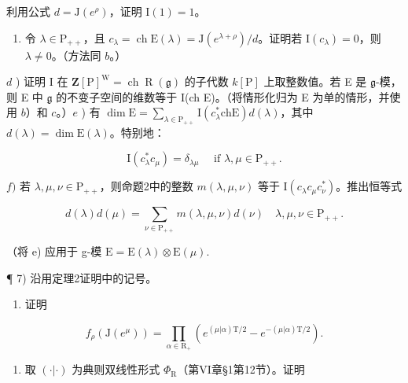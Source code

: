 利用公式 \(d = \mathrm{J}(e^{\rho})\)，证明 \(\mathrm{I}(1) = 1\)。

\begin{enumerate}
\def\labelenumi{\alph{enumi})}
\setcounter{enumi}{2}
\tightlist
\item
  令 \(\lambda \in \mathrm{P}_{++}\)，且 \(c_{\lambda} = \operatorname{ch} \mathrm{E}(\lambda) = \mathrm{J}(e^{\lambda + \rho}) / d\)。证明若 \(\mathrm{I}(c_{\lambda}) = 0\)，则 \(\lambda \neq 0\)。（方法同 \(b\)。）
\end{enumerate}

\(d\) ) 证明 I 在 \(\mathbf{Z}[\mathrm{P}]^{\mathrm{W}} = \operatorname {ch}\operatorname {R}(\mathfrak{g})\) 的子代数 \(k[\mathrm{P}]\) 上取整数值。若 E 是 \(\mathfrak{g}\)-模，则 E 中 \(\mathfrak{g}\) 的不变子空间的维数等于 I(ch E)。（将情形化归为 E 为单的情形，并使用 \(b\)）和 \(c\)。）\(e\) ) 有 \(\dim \mathrm{E} = \sum_{\lambda \in \mathrm{P}_{++}}\mathrm{I}(c_\lambda^*\mathrm{ch}\mathrm{E})d(\lambda)\)，其中 \(d(\lambda) = \dim \mathrm{E}(\lambda)\)。特别地：

\[
\mathrm{I} (c _ {\lambda} ^ {*} c _ {\mu}) = \delta_ {\lambda \mu} \quad \text { if } \lambda , \mu \in \mathrm{P} _ {+ +}.
\]

\(f)\) 若 \(\lambda, \mu, \nu \in \mathrm{P}_{++}\)，则命题2中的整数 \(m(\lambda, \mu, \nu)\) 等于 \(\mathrm{I}(c_{\lambda} c_{\mu} c_{\nu}^{*})\)。推出恒等式

\[
d (\lambda) d (\mu) = \sum_ {\nu \in \mathrm{P} _ {+ +}} m (\lambda , \mu , \nu) d (\nu) \quad \lambda , \mu , \nu \in \mathrm{P} _ {+ +}.
\]

（将 e) 应用于 g-模 \(\mathrm{E} = \mathrm{E}(\lambda) \otimes \mathrm{E}(\mu).\)

¶ 7) 沿用定理2证明中的记号。

\begin{enumerate}
\def\labelenumi{\alph{enumi})}
\tightlist
\item
  证明
\end{enumerate}

\[
f _ {\rho} (\mathrm{J} (e ^ {\mu})) = \prod_ {\alpha \in \mathrm{R} _ {+}} (e ^ {(\mu | \alpha) \mathrm{T} / 2} - e ^ {- (\mu | \alpha) \mathrm{T} / 2}).
\]

\begin{enumerate}
\def\labelenumi{\alph{enumi})}
\setcounter{enumi}{1}
\tightlist
\item
  取 \((\cdot |\cdot)\) 为典则双线性形式 \(\varPhi_{\mathrm{R}}\)（第VI章§1第12节）。证明
\end{enumerate}

